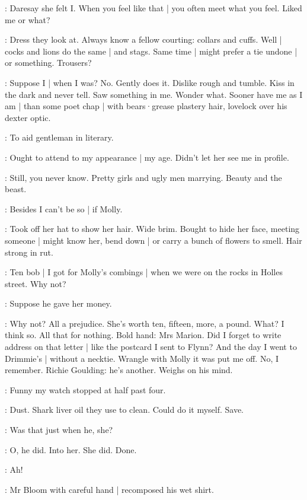 \BloomCurrent:
Daresay she felt I.
When you feel like that |
you often meet what you feel.
Liked me or what?

\BloomAbstract:
Dress they look at.
Always know a fellow courting:
collars and cuffs.%
Well |
cocks and lions do the same |
and stags.
Same time |
might prefer a tie undone |
or something.
Trousers?

\BloomCurrent:
Suppose I |
when I was?
No.
Gently does it.
Dislike rough and tumble.
Kiss in the dark
and never tell.
Saw something in me.
Wonder what.
Sooner have me
as I am |
than some poet chap |
with bears·grease plastery hair,
lovelock over his dexter optic.

\BloomAbstract:
To aid gentleman in literary.

\BloomCurrent:
Ought to attend to my appearance |
my age.
Didn't let her see me in profile.

\BloomAbstract:
Still,
you never know.
Pretty girls and ugly men marrying.
Beauty and the beast.

\BloomHist:
Besides I can't be so |
if Molly.

\BloomCurrent:
Took off her hat to show her hair.
Wide brim.
Bought to hide her face,
meeting someone |
might know her,
bend down |
or carry a bunch of flowers to smell.
Hair strong in rut.

\BloomHist:
Ten bob |
I got for Molly's combings |
when we were on the rocks
in Holles street.
Why not?

\BloomToday:
Suppose he gave her money.

\BloomHist:
Why not?
All a prejudice.
She's worth ten,
fifteen,
more,
a pound.
What?
I think so.
All that for nothing.
Bold hand:
Mrs Marion.
Did I forget
to write address on that letter |
like the postcard I sent to Flynn?
And the day I went to Drimmie's |
without a necktie.
Wrangle with Molly
it was put me off.
No,
I remember.
Richie Goulding:
he's another.
Weighs on his mind.

\BloomToday:
Funny my watch stopped at half past four.

\BloomAbstract:
Dust.
Shark liver oil
they use to clean.
Could do it myself.
Save.

\BloomToday:
Was that just when he,
she?

\BloomToday:
O,
he did.
Into her.
She did.
Done.

\BloomInt:
Ah!%

:
Mr Bloom with careful hand |
recomposed his wet shirt.

